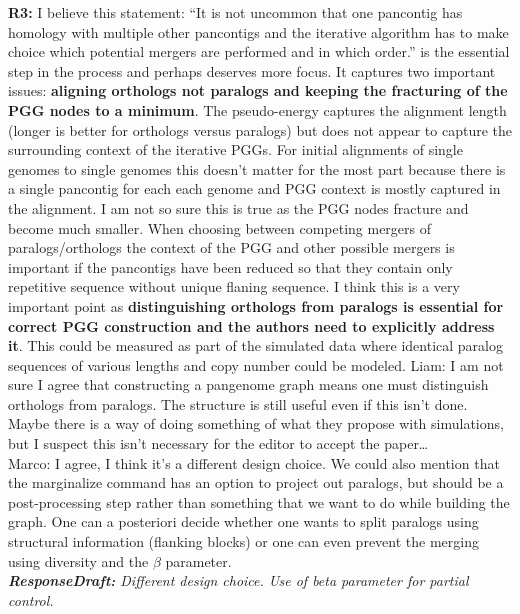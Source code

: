 \documentclass[aps,rmp,onecolumn]{revtex4-1}
\newcommand{\Marco}[1]{{\color{gray}Marco: #1}}
\newcommand{\Liam}[1]{{\color{teal}Liam: #1}}
\newcommand{\reviewer}[2]{\textbf{#1:} #2\vskip 5mm}
\newcommand{\responsedraft}[1]{{\it {\color{purple}\textbf{ResponseDraft:} #1}}\vskip 5mm}
\begin{document}
\reviewer{R3}{I believe this statement: ``It is not uncommon that one pancontig has homology with multiple other pancontigs and the iterative algorithm has to make choice which potential mergers are performed and in which order.'' is the essential step in the process and perhaps deserves more focus. It captures two important issues: \textbf{aligning orthologs not paralogs and keeping the fracturing of the PGG nodes to a minimum}. The pseudo-energy captures the alignment length (longer is better for orthologs versus paralogs) but does not appear to capture the surrounding context of the iterative PGGs. For initial alignments of single genomes to single genomes this doesn't matter for the most part because there is a single pancontig for each each genome and PGG context is mostly captured in the alignment. I am not so sure this is true as the PGG nodes fracture and become much smaller. When choosing between competing mergers of paralogs/orthologs the context of the PGG and other possible mergers is important if the pancontigs have been reduced so that they contain only repetitive sequence without unique flaning sequence. I think this is a very important point as \textbf{distinguishing orthologs from paralogs is essential for correct PGG construction and the authors need to explicitly address it}. This could be measured as part of the simulated data where identical paralog sequences of various lengths and copy number could be modeled.}
\Liam{I am not sure I agree that constructing a pangenome graph means one must distinguish orthologs from paralogs. The structure is still useful even if this isn't done. Maybe there is a way of doing something of what they propose with simulations, but I suspect this isn't necessary for the editor to accept the paper\ldots}\\
\Marco{I agree, I think it's a different design choice. We could also mention that the marginalize command has an option to project out paralogs, but should be a post-processing step rather than something that we want to do while building the graph. One can a posteriori decide whether one wants to split paralogs using structural information (flanking blocks) or one can even prevent the merging using diversity and the $\beta$ parameter.}\\
\responsedraft{
      Different design choice.
      Use of beta parameter for partial control.
}
\end{document}
